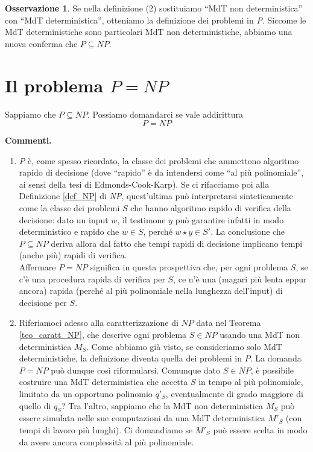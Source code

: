 \documentclass[12pt,a4paper]{report}
\theoremstyle{definition}
\newtheorem{oss}[teo]{Osservazione}  %
\begin{document}
\begin{oss}
Se nella definizione (2) sostituiamo ``MdT non deterministica'' con ``MdT deterministica'', otteniamo la definizione dei problemi in \emph{P}. Siccome le MdT deterministiche sono particolari MdT non deterministiche, abbiamo una nuova conferma che $P \subseteq NP$.
\end{oss}


\section{Il problema $P=NP$}

Sappiamo che $P \subseteq NP$. Possiamo domandarci se vale addirittura
$$P=NP$$

\noindent \textbf{Commenti.}
\begin{enumerate}
\item \emph{P} è, come spesso ricordato, la classe dei problemi che ammettono algoritmo rapido di decisione (dove ``rapido'' è da intendersi come ``al più polinomiale'', ai sensi della tesi di Edmonds-Cook-Karp). Se ci rifacciamo poi alla Definizione \ref{def_NP} di \emph{NP}, quest'ultima può interpretarsi sinteticamente come la classe dei problemi $S$ che hanno algoritmo rapido di verifica della decisione: dato un input $w$, il testimone $y$ può garantire infatti in modo deterministico e rapido che $w \in S$, perché $w \star y \in S'$. La conclusione che $P \subseteq NP$ deriva allora dal fatto che tempi rapidi di decisione implicano tempi (anche più) rapidi di verifica.\\
Affermare $P=NP$ significa in questa prospettiva che, per ogni problema $S$, se c'è una procedura rapida di verifica per $S$, ce n'è una (magari più lenta eppur ancora) rapida (perché al più polinomiale nella lunghezza dell'input) di decisione per $S$.
\item Riferiamoci adesso alla caratterizzazione di $NP$ data nel Teorema \ref{teo_caratt_NP}, che descrive ogni problema $S \in NP$ usando una MdT non deterministica $M_S$. Come abbiamo già visto, se consideriamo solo MdT deterministiche, la definizione diventa quella dei problemi in $P$. La domanda $P=NP$ può dunque così riformularsi. Comunque dato $S \in NP$, è possibile costruire una MdT deterministica che accetta $S$ in tempo al più polinomiale, limitato da un opportuno polinomio $q'_S$, eventualmente di grado maggiore di quello di $q_S$? Tra l'altro, sappiamo che la MdT non deterministica $M_S$ può essere simulata nelle sue computazioni da una MdT deterministica $M'_S$ (con tempi di lavoro più lunghi). Ci domandiamo se $M'_S$ può essere scelta in modo da avere ancora complessità al più polinomiale.
\end{enumerate}
\end{document}

